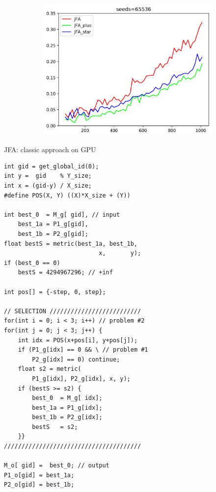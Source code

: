 \documentclass[aspectratio=169, 22pt]{beamer}
\begin{document}
\begin{frame}
\begin{figure}
\begin{subfigure}{.5\textwidth}
  \label{fig:sub2}
\end{subfigure}%
\begin{subfigure}{.5\textwidth}
  \centering
  \includegraphics[width=0.7\linewidth]{./figure_seed_65536.png}
  \label{fig:sub2}
\end{subfigure}
\label{fig:test}
\end{figure}

\end{frame}


\begin{frame}[fragile]{JFA: classic approach on GPU}

\vspace{-1em}
\begin{multicols}{2} %
\begin{verbatim}
int gid = get_global_id(0);
int y =  gid    % Y_size;
int x = (gid-y) / X_size;
#define POS(X, Y) ((X)*X_size + (Y))

int best_0  = M_g[ gid], // input
    best_1a = P1_g[gid],
    best_1b = P2_g[gid];
float bestS = metric(best_1a, best_1b,
                           x,       y);
if (best_0 == 0)
	bestS = 4294967296; // +inf

int pos[] = {-step, 0, step};

// SELECTION //////////////////////////
for(int i = 0; i < 3; i++) // problem #2
for(int j = 0; j < 3; j++) {
	int idx = POS(x+pos[i], y+pos[j]);
	if (P1_g[idx] == 0 && \ // problem #1
	    P2_g[idx] == 0) continue;
	float s2 = metric(
		P1_g[idx], P2_g[idx], x, y);
	if (bestS >= s2) {
		best_0  = M_g[ idx];
		best_1a = P1_g[idx];
		best_1b = P2_g[idx];
		bestS   = s2;
	}}
///////////////////////////////////////

M_o[ gid] =  best_0; // output
P1_o[gid] = best_1a;
P2_o[gid] = best_1b;
\end{verbatim}
\end{multicols}

\end{frame}
\end{document}
